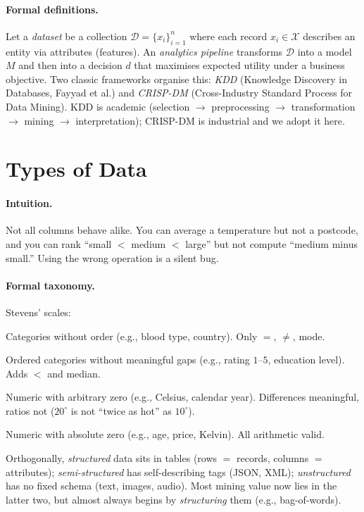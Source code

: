 \paragraph{Formal definitions.} Let a \emph{dataset} be a collection $\mathcal{D}=\{x_i\}_{i=1}^n$ where each record $x_i\in\mathcal{X}$ describes an entity via attributes (features). An \emph{analytics pipeline} transforms $\mathcal{D}$ into a model $M$ and then into a decision $d$ that maximises expected utility under a business objective. Two classic frameworks organise this: \emph{KDD} (Knowledge Discovery in Databases, Fayyad et al.) and \emph{CRISP-DM} (Cross-Industry Standard Process for Data Mining). KDD is academic (selection $\to$ preprocessing $\to$ transformation $\to$ mining $\to$ interpretation); CRISP-DM is industrial and we adopt it here.

\section{Types of Data}
\label{sec:data-types}
\paragraph{Intuition.} Not all columns behave alike. You can average a temperature but not a postcode, and you can rank ``small $<$ medium $<$ large'' but not compute ``medium minus small.'' Using the wrong operation is a silent bug.

\paragraph{Formal taxonomy.} Stevens' scales:
\begin{description}[leftmargin=1.2em, itemsep=0.3em]
    \item[Nominal] Categories without order (e.g., blood type, country). Only $=$, $\neq$, mode.
    \item[Ordinal] Ordered categories without meaningful gaps (e.g., rating $1$--$5$, education level). Adds $<$ and median.
    \item[Interval] Numeric with arbitrary zero (e.g., Celsius, calendar year). Differences meaningful, ratios not ($20^\circ$ is not ``twice as hot'' as $10^\circ$).
    \item[Ratio] Numeric with absolute zero (e.g., age, price, Kelvin). All arithmetic valid.
\end{description}
Orthogonally, \emph{structured} data sits in tables (rows $=$ records, columns $=$ attributes); \emph{semi-structured} has self-describing tags (JSON, XML); \emph{unstructured} has no fixed schema (text, images, audio). Most mining value now lies in the latter two, but almost always begins by \emph{structuring} them (e.g., bag-of-words).


